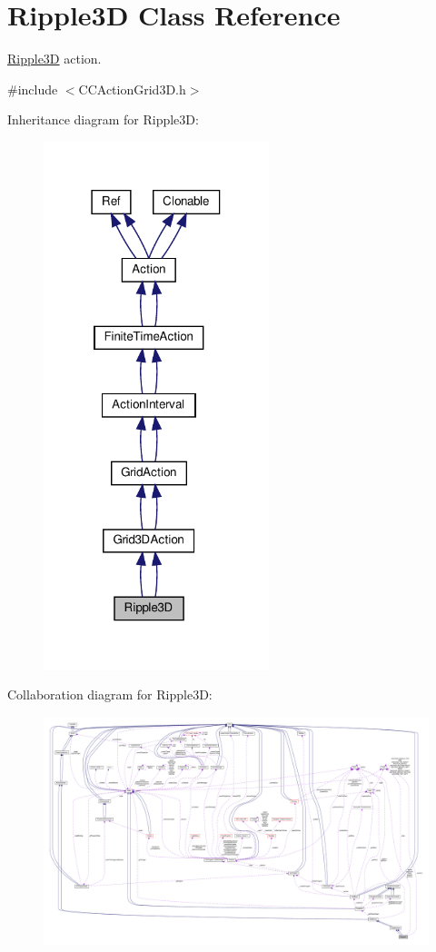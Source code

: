 \hypertarget{classRipple3D}{}\section{Ripple3D Class Reference}
\label{classRipple3D}


\hyperlink{classRipple3D}{Ripple3D} action.  




{\ttfamily \#include $<$C\+C\+Action\+Grid3\+D.\+h$>$}



Inheritance diagram for Ripple3D\+:
\nopagebreak
\begin{figure}[H]
\begin{center}
\leavevmode
\includegraphics[width=186pt]{classRipple3D__inherit__graph}
\end{center}
\end{figure}


Collaboration diagram for Ripple3D\+:
\nopagebreak
\begin{figure}[H]
\begin{center}
\leavevmode
\includegraphics[width=350pt]{classRipple3D__coll__graph}
\end{center}
\end{figure}

